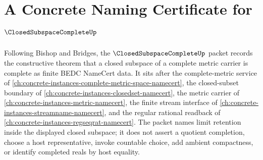 \chapter{A Concrete Naming Certificate for $\ClosedSubspaceCompleteUp$}
\label{ch:concrete-instances-closed-subspace-complete-namecert}

Following Bishop and Bridges, the $\ClosedSubspaceCompleteUp$ packet records the constructive theorem that a closed subspace of a complete metric carrier is complete as finite BEDC NameCert data. It sits after the complete-metric service of \autoref{ch:concrete-instances-complete-metric-space-namecert}, the closed-subset boundary of \autoref{ch:concrete-instances-closedset-namecert}, the metric carrier of \autoref{ch:concrete-instances-metric-namecert}, the finite stream interface of \autoref{ch:concrete-instances-streamname-namecert}, and the regular rational readback of \autoref{ch:concrete-instances-regseqrat-namecert}. The packet names limit retention inside the displayed closed subspace; it does not assert a quotient completion, choose a host representative, invoke countable choice, add ambient compactness, or identify completed reals by host equality.

